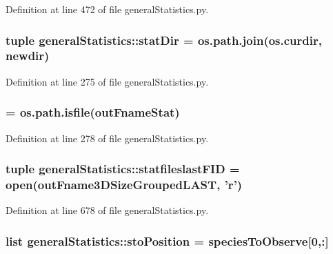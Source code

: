 \-Definition at line 472 of file general\-Statistics.\-py.

\hypertarget{namespacegeneral_statistics_a6267f224190a3e4cc4743c3c3710fe0a}{
\subsubsection[{stat\-Dir}]{\setlength{\rightskip}{0pt plus 5cm}tuple {\bf general\-Statistics\-::stat\-Dir} = os.\-path.\-join(os.\-curdir, {\bf newdir})}}\label{namespacegeneral_statistics_a6267f224190a3e4cc4743c3c3710fe0a}


\-Definition at line 275 of file general\-Statistics.\-py.

\hypertarget{namespacegeneral_statistics_a54d5cb035107bb188a78056c1f62ef26}{
\subsubsection[{statfiles\-Flag}]{ = os.\-path.\-isfile({\bf out\-Fname\-Stat})}}\label{namespacegeneral_statistics_a54d5cb035107bb188a78056c1f62ef26}


\-Definition at line 278 of file general\-Statistics.\-py.

\hypertarget{namespacegeneral_statistics_a3ce9d5db09e5f3011e0b7b2375b4e702}{
\subsubsection[{statfileslast\-F\-I\-D}]{\setlength{\rightskip}{0pt plus 5cm}tuple {\bf general\-Statistics\-::statfileslast\-F\-I\-D} = open({\bf out\-Fname3\-D\-Size\-Grouped\-L\-A\-S\-T}, '{\bf r}')}}\label{namespacegeneral_statistics_a3ce9d5db09e5f3011e0b7b2375b4e702}


\-Definition at line 678 of file general\-Statistics.\-py.

\hypertarget{namespacegeneral_statistics_ad6f78bf5f1f1301baa9e3ecd82fe10c1}{
\subsubsection[{sto\-Position}]{\setlength{\rightskip}{0pt plus 5cm}list {\bf general\-Statistics\-::sto\-Position} = {\bf species\-To\-Observe}\mbox{[}0,\-:\mbox{]}}}\label{namespacegeneral_statistics_ad6f78bf5f1f1301baa9e3ecd82fe10c1}



